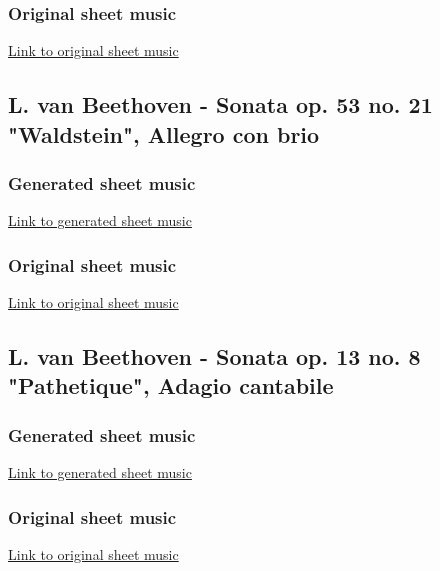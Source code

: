 \documentclass{article}
\begin{document}
\subsubsection{Original sheet music}
\hyperref[fig:original_chopin]{Link to original sheet music}

\subsection{L. van Beethoven - Sonata op. 53 no. 21 "Waldstein", Allegro con brio}

\subsubsection{Generated sheet music}
\hyperref[fig:generated_waldstein]{Link to generated sheet music}

\subsubsection{Original sheet music}
\hyperref[fig:original_waldstein]{Link to original sheet music}

\subsection{L. van Beethoven - Sonata op. 13 no. 8 "Pathetique", Adagio cantabile}

\subsubsection{Generated sheet music}
\hyperref[fig:generated_pathetique]{Link to generated sheet music}

\subsubsection{Original sheet music}
\hyperref[fig:original_pathetique]{Link to original sheet music}


\clearpage
\begin{figure}[htbp]
    \centering
    \label{fig:generated_chopin}
    
\end{figure}

\clearpage
\begin{figure}[htbp]
    \centering
    \label{fig:original_chopin}
    
\end{figure}
\end{document}
